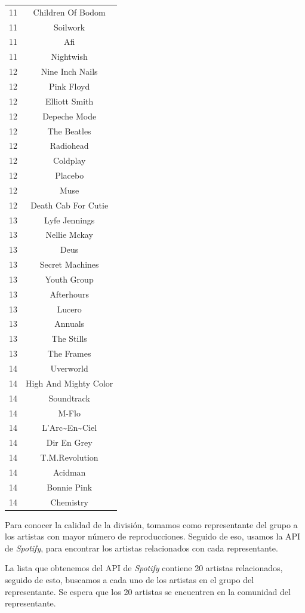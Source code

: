 \documentclass[conference]{IEEEtran}
\begin{document}
\begin{table}[]
\begin{tabular}{|c|c|}
11 & Children Of Bodom \\ 
11 & Soilwork \\ 
11 & Afi \\ 
11 & Nightwish \\  \hline
12 & Nine Inch Nails \\ 
12 & Pink Floyd \\ 
12 & Elliott Smith \\ 
12 & Depeche Mode \\ 
12 & The Beatles \\ 
12 & Radiohead \\ 
12 & Coldplay \\ 
12 & Placebo \\ 
12 & Muse \\ 
12 & Death Cab For Cutie \\  \hline
13 & Lyfe Jennings \\ 
13 & Nellie Mckay \\ 
13 & Deus \\ 
13 & Secret Machines \\ 
13 & Youth Group \\ 
13 & Afterhours \\ 
13 & Lucero \\ 
13 & Annuals \\ 
13 & The Stills \\ 
13 & The Frames \\  \hline
14 & Uverworld \\ 
14 & High And Mighty Color \\ 
14 & Soundtrack \\ 
14 & M-Flo \\ 
14 & L'Arc\~{}En\~{}Ciel \\ 
14 & Dir En Grey \\ 
14 & T.M.Revolution \\ 
14 & Acidman \\ 
14 & Bonnie Pink \\ 
14 & Chemistry \\ 

   \hline
\end{tabular}
\end{table}
\newpage
Para conocer la calidad de la división, tomamos como representante del grupo a los artistas con mayor número de reproducciones. Seguido de eso, usamos la API de \textit{Spotify}, para encontrar los artistas relacionados con cada representante.


La lista que obtenemos del API de \textit{Spotify} contiene 20 artistas relacionados, seguido de esto,  
buscamos a cada uno de los artistas en el grupo del representante. Se espera que los 20 artistas 
se encuentren en la comunidad del representante.
\end{document}
